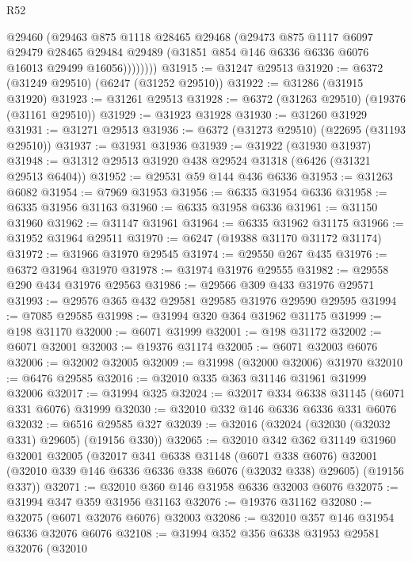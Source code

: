 \begin{lexlean}{R52}
\begin{coremodule}
              @29460
              (@29463
                @875
                @1118
                @28465
                @29468
                (@29473
                  @875
                  @1117
                  @6097
                  @29479
                  @28465
                  @29484
                  @29489
                  (@31851 @854 @146 @6336 @6336 @6076 @16013 @29499 @16056))))))))
@31915 := @31247 @29513
@31920 := @6372 (@31249 @29510) (@6247 (@31252 @29510))
@31922 := @31286 (@31915 @31920)
@31923 := @31261 @29513
@31928 := @6372 (@31263 @29510) (@19376 (@31161 @29510))
@31929 := @31923 @31928
@31930 := @31260 @31929
@31931 := @31271 @29513
@31936 := @6372 (@31273 @29510) (@22695 (@31193 @29510))
@31937 := @31931 @31936
@31939 := @31922 (@31930 @31937)
@31948 := @31312 @29513 @31920 @438 @29524 @31318 (@6426 (@31321 @29513 @6404))
@31952 := @29531 @59 @144 @436 @6336
@31953 := @31263 @6082
@31954 := @7969 @31953
@31956 := @6335 @31954 @6336
@31958 := @6335 @31956 @31163
@31960 := @6335 @31958 @6336
@31961 := @31150 @31960
@31962 := @31147 @31961
@31964 := @6335 @31962 @31175
@31966 := @31952 @31964 @29511
@31970 := @6247 (@19388 @31170 @31172 @31174)
@31972 := @31966 @31970 @29545
@31974 := @29550 @267 @435
@31976 := @6372 @31964 @31970
@31978 := @31974 @31976 @29555
@31982 := @29558 @290 @434 @31976 @29563
@31986 := @29566 @309 @433 @31976 @29571
@31993 := @29576 @365 @432 @29581 @29585 @31976 @29590 @29595
@31994 := @7085 @29585
@31998 := @31994 @320 @364 @31962 @31175
@31999 := @198 @31170
@32000 := @6071 @31999
@32001 := @198 @31172
@32002 := @6071 @32001
@32003 := @19376 @31174
@32005 := @6071 @32003 @6076
@32006 := @32002 @32005
@32009 := @31998 (@32000 @32006) @31970
@32010 := @6476 @29585
@32016 := @32010 @335 @363 @31146 @31961 @31999 @32006
@32017 := @31994 @325
@32024 := @32017 @334 @6338 @31145 (@6071 @331 @6076) @31999
@32030 := @32010 @332 @146 @6336 @6336 @331 @6076
@32032 := @6516 @29585 @327
@32039 := @32016 (@32024 (@32030 (@32032 @331) @29605) (@19156 @330))
@32065 := @32010
    @342
    @362
    @31149
    @31960
    @32001
    @32005
    (@32017
      @341
      @6338
      @31148
      (@6071 @338 @6076)
      @32001
      (@32010 @339 @146 @6336 @6336 @338 @6076 (@32032 @338) @29605)
      (@19156 @337))
@32071 := @32010 @360 @146 @31958 @6336 @32003 @6076
@32075 := @31994 @347 @359 @31956 @31163
@32076 := @19376 @31162
@32080 := @32075 (@6071 @32076 @6076) @32003
@32086 := @32010 @357 @146 @31954 @6336 @32076 @6076
@32108 := @31994
    @352
    @356
    @6338
    @31953
    @29581
    @32076
    (@32010

\end{coremodule}
\end{lexlean}
